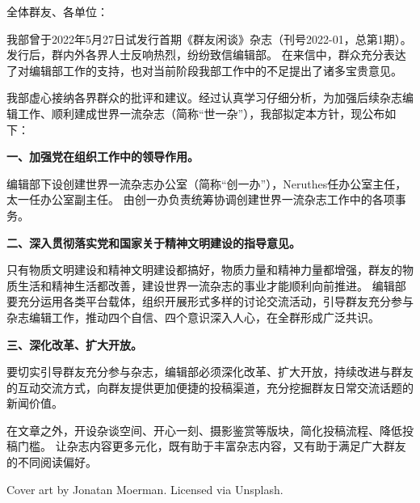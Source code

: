 

\noindent
全体群友、各单位：

我部曾于2022年5月27日试发行首期《群友闲谈》杂志（刊号2022-01，总第1期）。发行后，群内外各界人士反响热烈，纷纷致信编辑部。
在来信中，群众充分表达了对编辑部工作的支持，也对当前阶段我部工作中的不足提出了诸多宝贵意见。

我部虚心接纳各界群众的批评和建议。经过认真学习仔细分析，为加强后续杂志编辑工作、顺利建成世界一流杂志（简称“世一杂”），我部拟定本方针，现公布如下：

\textbf{一、加强党在组织工作中的领导作用。}

编辑部下设创建世界一流杂志办公室（简称“创一办”），Neruthes任办公室主任，太一任办公室副主任。
由创一办负责统筹协调创建世界一流杂志工作中的各项事务。

\textbf{二、深入贯彻落实党和国家关于精神文明建设的指导意见。}

只有物质文明建设和精神文明建设都搞好，物质力量和精神力量都增强，群友的物质生活和精神生活都改善，建设世界一流杂志的事业才能顺利向前推进。
编辑部要充分运用各类平台载体，组织开展形式多样的讨论交流活动，引导群友充分参与杂志编辑工作，推动四个自信、四个意识深入人心，在全群形成广泛共识。

\textbf{三、深化改革、扩大开放。}

要切实引导群友充分参与杂志，编辑部必须深化改革、扩大开放，持续改进与群友的互动交流方式，向群友提供更加便捷的投稿渠道，充分挖掘群友日常交流话题的新闻价值。

在文章之外，开设杂谈空间、开心一刻、摄影鉴赏等版块，简化投稿流程、降低投稿门槛。
让杂志内容更多元化，既有助于丰富杂志内容，又有助于满足广大群友的不同阅读偏好。









\noindent
Cover art by Jonatan Moerman. Licensed via Unsplash.




